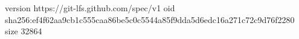 version https://git-lfs.github.com/spec/v1
oid sha256:ef4f62aa9cb1c555caa86be5c0c5544a85f9dda5d6edc16a271c72c9d76f2280
size 32864
